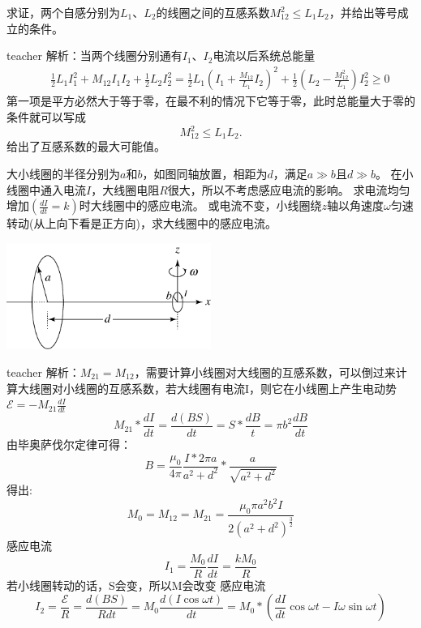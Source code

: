 \begin{example}
求证，两个自感分别为$L_1$、$L_2$的线圈之间的互感系数$M_{12}^2 \le L_1L_2$，并给出等号成立的条件。
\begin{taggedblock}{teacher}
\newline
解析：当两个线圈分别通有$I_1$、$I_2$电流以后系统总能量
\begin{eqnarray*}
&&\frac{1}{2}L_1I_1^2+M_{12}I_1I_2+ \frac{1}{2}L_2I_2^2= \frac{1}{2}L_1\left(I_1+ \frac{M_{12}}{L_1}I_2\right)^2+\frac{1}{2}\left(L_2-\frac{M_{12}^2}{L_1}\right)I_2^2\ge 0
\end{eqnarray*}
第一项是平方必然大于等于零，在最不利的情况下它等于零，此时总能量大于零的条件就可以写成
\[M_{12}^2\le L_1L_2.\]
给出了互感系数的最大可能值。


\end{taggedblock}
\end{example}



\begin{example}
大小线圈的半径分别为$a$和$b$，如图同轴放置，相距为$d$，满足$a\gg b$且$d\gg b$。
在小线圈中通入电流$I$，大线圈电阻$R$很大，所以不考虑感应电流的影响。
求电流均匀增加$( \frac{dI}{dt} = k)$时大线圈中的感应电流。
或电流不变，小线圈绕$z$轴以角速度$\omega$匀速转动(从上向下看是正方向)，求大线圈中的感应电流。
\begin{flushright}
\includegraphics[width=0.5\textwidth]{images/mag-26.pdf}
\end{flushright}

\begin{taggedblock}{teacher}
\noindent
解析：$M_{21}=M_{12}$，需要计算小线圈对大线圈的互感系数，可以倒过来计算大线圈对小线圈的互感系数，若大线圈有电流I，则它在小线圈上产生电动势$\mathcal{E}=-M_{21}\frac{dI}{dt}$
\[M_{21}*\frac{dI}{dt}=\frac{d(BS)}{dt}=S*\frac{dB}{t}=\pi b^2\frac{dB}{dt}\]
由毕奥萨伐尔定律可得：\[B=\frac{\mu_0}{4\pi}\frac{I*2\pi a}{a^2+d^2}*\frac{a}{\sqrt{a^2+d^2}}\]
得出:
\[M_0=M_{12}=M_{21}=\frac{\mu_0\pi a^2b^2I}{2(a^2+d^2)^{\frac{3}{2}}}\]
感应电流\[I_1=\frac{M_0}{R}\frac{dI}{dt}=\frac{kM_0}{R}\]
若小线圈转动的话，S会变，所以M会改变
感应电流\[I_2=\frac{\mathcal{E}}{R}=\frac{d(BS)}{Rdt}=M_0\frac{d(I\cos\omega t)}{dt}=M_0*(\frac{dI}{dt}\cos\omega t-I\omega\sin\omega t)\]
\end{taggedblock}
\end{example}





